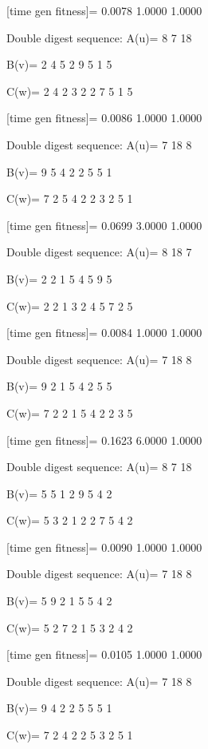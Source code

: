 [time gen fitness]=
    0.0078    1.0000    1.0000

Double digest sequence:
A(u)=
     8     7    18

B(v)=
     2     4     5     2     9     5     1     5

C(w)=
     2     4     2     3     2     2     7     5     1     5

[time gen fitness]=
    0.0086    1.0000    1.0000

Double digest sequence:
A(u)=
     7    18     8

B(v)=
     9     5     4     2     2     5     5     1

C(w)=
     7     2     5     4     2     2     3     2     5     1

[time gen fitness]=
    0.0699    3.0000    1.0000

Double digest sequence:
A(u)=
     8    18     7

B(v)=
     2     2     1     5     4     5     9     5

C(w)=
     2     2     1     3     2     4     5     7     2     5

[time gen fitness]=
    0.0084    1.0000    1.0000

Double digest sequence:
A(u)=
     7    18     8

B(v)=
     9     2     1     5     4     2     5     5

C(w)=
     7     2     2     1     5     4     2     2     3     5

[time gen fitness]=
    0.1623    6.0000    1.0000

Double digest sequence:
A(u)=
     8     7    18

B(v)=
     5     5     1     2     9     5     4     2

C(w)=
     5     3     2     1     2     2     7     5     4     2

[time gen fitness]=
    0.0090    1.0000    1.0000

Double digest sequence:
A(u)=
     7    18     8

B(v)=
     5     9     2     1     5     5     4     2

C(w)=
     5     2     7     2     1     5     3     2     4     2

[time gen fitness]=
    0.0105    1.0000    1.0000

Double digest sequence:
A(u)=
     7    18     8

B(v)=
     9     4     2     2     5     5     5     1

C(w)=
     7     2     4     2     2     5     3     2     5     1


